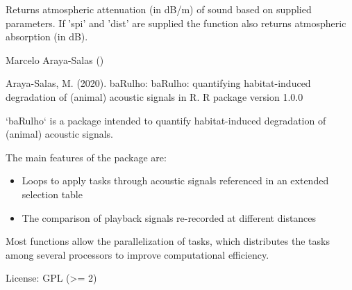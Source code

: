 \documentclass[letterpaper]{book}
\begin{document}
%
\begin{Value}
Returns atmospheric attenuation (in dB/m) of sound based on supplied parameters. If 'spi' and 'dist' are supplied the function also returns atmospheric absorption (in dB).
\end{Value}
%
\begin{Author}\relax
Marcelo Araya-Salas ()
\end{Author}
%
\begin{References}\relax

Araya-Salas, M. (2020). baRulho: baRulho: quantifying habitat-induced degradation of (animal) acoustic signals in R. R package version 1.0.0

\end{References}
%
\begin{Examples}
\end{Examples}
%
\begin{Description}\relax
`baRulho` is a package intended to quantify habitat-induced degradation of (animal) acoustic signals.
\end{Description}
%
\begin{Details}\relax
The main features of the package are:
\begin{itemize}

\item{} Loops to apply tasks through acoustic signals referenced in an extended selection table
\item{} The comparison of playback signals re-recorded at different distances 

\end{itemize}

Most functions allow the parallelization of tasks, which distributes the tasks among several processors to improve computational efficiency.

License: GPL (>= 2)
\end{Details}
\end{document}
